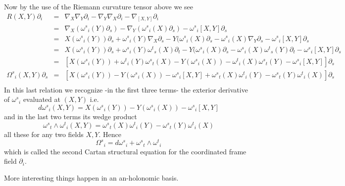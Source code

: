 \documentclass[12pt]{article}
\begin{document}
Now by the use of the Riemann curvature tensor above we see
\begin{eqnarray*}
R(X,Y)\partial_i&=&\nabla_X\nabla_Y\partial_i-\nabla_Y\nabla_X\partial_i-\nabla_{[X,Y]}\partial_i\\
    &=&\nabla_X({\omega^s}_i(Y)\partial_s)-\nabla_Y({\omega^s}_i(X)\partial_s)-{\omega^s}_i[X,Y]\partial_s\\
    &=&X({\omega^s}_i(Y))\partial_s+{\omega^s}_i(Y)\nabla_X\partial_s-
Y({\omega^s}_i(X)\partial_s-{\omega^s}_i(X)\nabla_Y\partial_s-{\omega^s}_i[X,Y]\partial_s\\
    &=&X({\omega^s}_i(Y))\partial_s+{\omega^s}_i(Y){\omega^t}_s(X)\partial_t-
Y({\omega^s}_i(X)\partial_s-{\omega^s}_i(X){\omega^t}_s(Y)\partial_t-{\omega^s}_i[X,Y]\partial_s\\
    &=&[X({\omega^s}_i(Y))+{\omega^t}_i(Y){\omega^s}_t(X)-Y({\omega^s}_i(X))-{\omega^t}_i(X){\omega^s}_t(Y)-{\omega^s}_i[X,Y]]\partial_s\\
{\Omega^s}_i(X,Y)\partial_s &=& [X({\omega^s}_i(Y))-Y({\omega^s}_i(X))-{\omega^s}_i[X,Y]+{\omega^s}_t(X){\omega^t}_i(Y)-{\omega^s}_t(Y){\omega^t}_i(X)]\partial_s\\
\end{eqnarray*}
In this last relation we recognize -in the first three terms- the exterior derivative of ${\omega^s}_i$ evaluated at $(X,Y)$ i.e.
$$d{\omega^s}_i(X,Y)=X({\omega^s}_i(Y))-Y({\omega^s}_i(X))-{\omega^s}_i[X,Y]$$
and in the last two terms its wedge product 
$${\omega^s}_t\wedge{\omega^t}_i(X,Y)={\omega^s}_t(X){\omega^t}_i(Y)-{\omega^s}_t(Y){\omega^t}_i(X)$$  
all these for any two fields $X,Y$. Hence
$${\Omega^s}_i=d{\omega^s}_i+{\omega^s}_t\wedge{\omega^t}_i$$
which is called the second Cartan structural equation for the coordinated frame field $\partial_i$.


More interesting things happen in an an-holonomic basis. 
\end{document}
